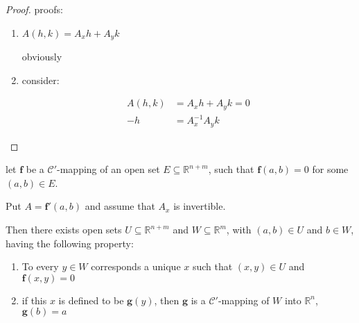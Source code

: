 \begin{proof}
    proofs:

    \begin{enumerate}
        \item $A(h,k) = A_xh + A_yk$ 

        obviously

        \item consider:
        
        \begin{align*}
            A(h,k) &= A_xh + A_yk = 0 \\
                -h &= A_x^{-1}A_y k 
        \end{align*}
    \end{enumerate}
\end{proof}

\begin{thm}
    let $\mathbf{f}$ be a $\mathscr{C}'$-mapping of an open set $E \subseteq \mathbb{R}^{n+m}$,
    such that $\mathbf{f}(a,b) = 0$ for some $(a,b) \in E$.

    Put $A = \mathbf{f}'(a,b)$ and assume that $A_x$ is invertible.

    Then there exists open sets $U \subseteq \mathbb{R}^{n+m}$ and $W \subseteq \mathbb{R}^{m}$,
    with $(a,b) \in U$ and $b \in W$, having the following property:

    \begin{enumerate}
        \item To every $y \in W$ corresponds a unique $x$ such that $(x,y) \in U$ and $\mathbf{f}(x,y) = 0$

        \item if this $x$ is defined to be $\mathbf{g}(y)$, then $\mathbf{g}$ is a $\mathscr{C}'$-mapping of 
        $W$ into $\mathbb{R}^n$, $\mathbf{g}(b) = a$
    \end{enumerate}
\end{thm}

